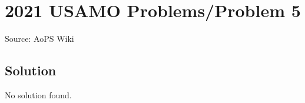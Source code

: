 \documentclass[12pt]{article}
\begin{document}
\section*{{2021 USAMO Problems/Problem 5}}
Source: AoPS Wiki

\subsection*{Solution}
No solution found.
\end{document}
